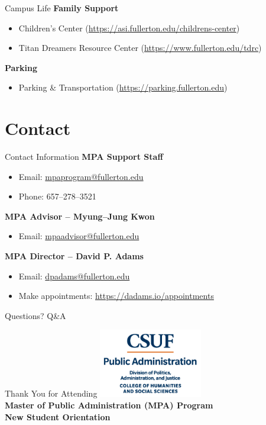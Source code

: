 \documentclass[10pt]{beamer}
\begin{document}
\begin{frame}{Campus Life}
\textbf{Family Support}
\begin{itemize}
  \item Children's Center \small(\url{https://asi.fullerton.edu/childrens-center})
  \item Titan Dreamers Resource Center \small(\url{https://www.fullerton.edu/tdrc})
\end{itemize}

\textbf{Parking}
\begin{itemize}
  \item Parking \& Transportation \small(\url{https://parking.fullerton.edu})
\end{itemize}
\end{frame}

\section{\textcolor{titanorange}{Contact}}
\begin{frame}{Contact Information}
\textbf{MPA Support Staff}\\[-2pt]
\begin{itemize}
  \item Email: \href{mailto:mpaprogram@fullerton.edu}{mpaprogram@fullerton.edu}
  \item Phone: 657--278--3521
\end{itemize}

\textbf{MPA Advisor -- Myung--Jung Kwon}\\[-2pt]
\begin{itemize}
  \item Email: \href{mailto:mpaadvisor@fullerton.edu}{mpaadvisor@fullerton.edu}
\end{itemize}

\textbf{MPA Director -- David P. Adams}\\[-2pt]
\begin{itemize}
  \item Email: \href{mailto:dpadams@fullerton.edu}{dpadams@fullerton.edu}
  \item Make appointments: \url{https://dadams.io/appointments}
\end{itemize}
\end{frame}

\begin{frame}[standout]{Questions?}
\huge{Q\&A}
\end{frame}

\begin{frame}{Thank You for Attending}
\centering
\includegraphics[height=3cm]{images/PUBLIC-ADMINISTRATION-color.png}\\[10pt]
\textbf{Master of Public Administration (MPA) Program}\\
\textbf{New Student Orientation}
\end{frame}
\end{document}
